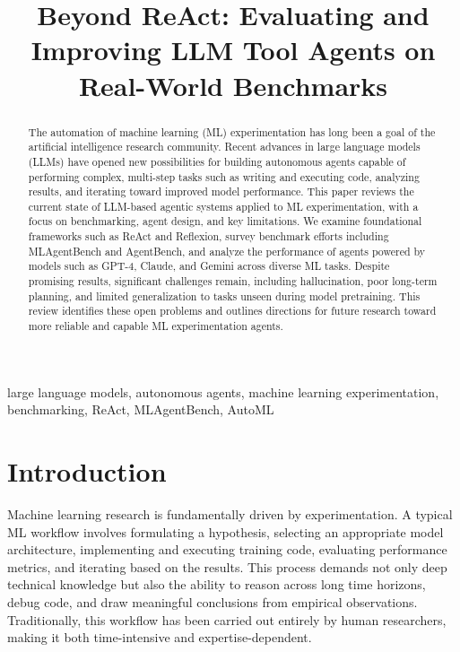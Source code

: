 \documentclass[conference]{IEEEtran}
\begin{document}
\title{Beyond ReAct: Evaluating and Improving LLM Tool Agents on Real-World Benchmarks}

\author{
    \and
}

\maketitle

\begin{abstract}
The automation of machine learning (ML) experimentation has long been a goal
of the artificial intelligence research community. Recent advances in large
language models (LLMs) have opened new possibilities for building autonomous
agents capable of performing complex, multi-step tasks such as writing and
executing code, analyzing results, and iterating toward improved model
performance. This paper reviews the current state of LLM-based agentic systems
applied to ML experimentation, with a focus on benchmarking, agent design, and
key limitations. We examine foundational frameworks such as ReAct and
Reflexion, survey benchmark efforts including MLAgentBench and AgentBench, and
analyze the performance of agents powered by models such as GPT-4, Claude, and
Gemini across diverse ML tasks. Despite promising results, significant
challenges remain, including hallucination, poor long-term planning, and limited
generalization to tasks unseen during model pretraining. This review identifies
these open problems and outlines directions for future research toward more
reliable and capable ML experimentation agents.
\end{abstract}

\begin{IEEEkeywords}
large language models, autonomous agents, machine learning experimentation,
benchmarking, ReAct, MLAgentBench, AutoML
\end{IEEEkeywords}


\section{Introduction}

Machine learning research is fundamentally driven by experimentation. A typical
ML workflow involves formulating a hypothesis, selecting an appropriate model
architecture, implementing and executing training code, evaluating performance
metrics, and iterating based on the results. This process demands not only deep
technical knowledge but also the ability to reason across long time horizons,
debug code, and draw meaningful conclusions from empirical observations.
Traditionally, this workflow has been carried out entirely by human researchers,
making it both time-intensive and expertise-dependent.
\end{document}
